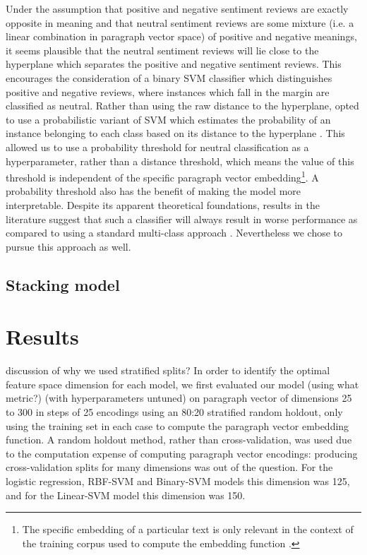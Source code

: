 \documentclass[11pt]{article}
\newcommand{\drafting}[1]{\textcolor{OliveGreen}{#1}}
\begin{document}
Under the assumption that positive and negative sentiment reviews are exactly opposite in meaning and that neutral sentiment reviews are some mixture (i.e. a linear combination in paragraph vector space) of positive and negative meanings, it seems plausible that the neutral sentiment reviews will lie close to the hyperplane which separates the positive and negative sentiment reviews. This encourages the consideration of a binary SVM classifier which distinguishes positive and negative reviews, where instances which fall in the margin are classified as neutral. Rather than using the raw distance to the hyperplane, opted to use a probabilistic variant of SVM which estimates the probability of an instance belonging to each class based on its distance to the hyperplane \cite{platt_probabilistic_1999}. This allowed us to use a probability threshold for neutral classification as a hyperparameter, rather than a distance threshold, which means the value of this threshold is independent of the specific paragraph vector embedding\footnote{The specific embedding of a particular text is only relevant in the context of the training corpus used to compute the embedding function \cite{le_distributed_2014}.}. A probability threshold also has the benefit of making the model more interpretable. Despite its apparent theoretical foundations, results in the literature suggest that such a classifier will always result in worse performance as compared to using a standard multi-class approach \cite{koppel_importance_2006}. Nevertheless we chose to pursue this approach as well.


\subsection{Stacking model}


\section{Results}
\drafting{discussion of why we used stratified splits?}
In order to identify the optimal feature space dimension for each model, we first evaluated our model \drafting{(using what metric?)} (with hyperparameters untuned) on paragraph vector of dimensions 25 to 300 in steps of 25 encodings using an 80:20 stratified random holdout, only using the training set in each case to compute the paragraph vector embedding function. A random holdout method, rather than cross-validation, was used due to the computation expense of computing paragraph vector encodings: producing cross-validation splits for many dimensions was out of the question. For the \drafting{logistic regression}, RBF-SVM and Binary-SVM models this dimension was 125, and for the Linear-SVM model this dimension was 150. 
\end{document}
